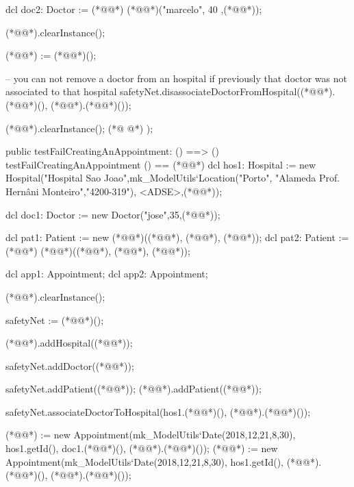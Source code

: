 \begin{vdmpp}[breaklines=true]
    dcl doc2: Doctor := (*@@*) (*@@*)("marcelo", 40 ,(*@@*));
    
    (*@@*).clearInstance();
    
    (*@@*) := (*@@*)();
   
    -- you can not remove a doctor from an hospital if previously that doctor was not associated to that hospital
    safetyNet.disassociateDoctorFromHospital((*@@*).(*@@*)(), (*@@*).(*@@*)());
   
    (*@@*).clearInstance();
(*@
\label{testFailCreatingAnAppointment:1077}
@*)
   );
 
 
 public testFailCreatingAnAppointment: () ==> ()
  testFailCreatingAnAppointment () == (*@\vdmnotcovered{(}@*)
   dcl hos1: Hospital := new Hospital("Hospital Sao Joao",mk_ModelUtils`Location("Porto", "Alameda Prof. Hernâni Monteiro","4200-319"), {<ADSE>,(*@@*)});
  
  dcl doc1: Doctor := new Doctor("jose",35,(*@@*));
  
  dcl pat1: Patient := new (*@@*)((*@@*), (*@@*), (*@@*));
  dcl pat2: Patient := (*@@*) (*@@*)((*@@*), (*@@*), (*@@*));
  
  dcl app1: Appointment;
  dcl app2: Appointment;
  
   (*@@*).clearInstance();
    
   safetyNet := (*@@*)();
   
   (*@@*).addHospital((*@@*));
    
  safetyNet.addDoctor((*@@*));
  
  safetyNet.addPatient((*@@*));
  (*@@*).addPatient((*@@*));

  safetyNet.associateDoctorToHospital(hos1.(*@@*)(), (*@@*).(*@@*)());

  (*@@*) := new Appointment(mk_ModelUtils`Date(2018,12,21,8,30), hos1.getId(), doc1.(*@@*)(), (*@@*).(*@@*)());
  (*@@*) := new Appointment(mk_ModelUtils`Date(2018,12,21,8,30), hos1.getId(), (*@@*).(*@@*)(), (*@@*).(*@@*)());


\end{vdmpp}
